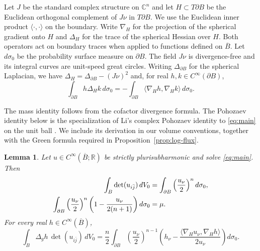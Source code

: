 \documentclass[11pt]{article}
\newtheorem{lemma}[theorem]{Lemma}
\newcommand{\C}{\mathbb C}
\newcommand{\R}{\mathbb R}
\begin{document}
Let $J$ be the standard complex structure on $\C^n$ and let
$H\subset T\partial B$ be the Euclidean orthogonal complement of
$J\nu$ in $T\partial B$. We use the Euclidean inner product
$\langle\cdot,\cdot\rangle$ on the boundary. Write $\nabla_H$ for the projection of the
spherical gradient onto $H$ and $\Delta_H$ for the trace of the
spherical Hessian over $H$. Both operators act on boundary traces
when applied to functions defined on $\overline B$. Let $d\sigma_0$
be the probability surface measure on $\partial B$. The field $J\nu$
is divergence-free and its integral curves are unit-speed great
circles. Writing $\Delta_{\partial B}$ for the spherical Laplacian,
we have $\Delta_H=\Delta_{\partial B}-(J\nu)^2$ and, for real
$h,k\in C^\infty(\partial B)$,
\begin{equation}\label{eq:horizontal-ibp}
 \int_{\partial B}h\Delta_Hk\,d\sigma_0
 =-\int_{\partial B}\langle\nabla_Hh,\nabla_Hk\rangle\,d\sigma_0.
\end{equation}

The mass identity follows from the cofactor divergence formula.
The Pohozaev identity below is the specialization of Li's complex
Pohozaev identity to \eqref{eq:main} on the unit ball \cite{Li2016}.
We include its derivation in our volume conventions, together with
the Green formula required in Proposition~\ref{prop:log-flux}.

\begin{lemma}\label{lem:boundary}
Let $u\in C^\infty(\overline B;\R)$ be strictly plurisubharmonic
and solve \eqref{eq:main}. Then
\begin{align}
 \int_B\det(u_{i\bar j})\,dV_0
 &=\int_{\partial B}\left(\frac{u_\nu}{2}\right)^n d\sigma_0,\notag\\
 \int_{\partial B}\left(\frac{u_\nu}{2}\right)^n
       \left(1-\frac{u_\nu}{2(n+1)}\right)d\sigma_0
 &=\mu.\label{eq:mass-pohozaev}
\end{align}
For every real $h\in C^\infty(\overline B)$,
\begin{equation}\label{eq:flux}
 \int_B\Delta_gh\,\det(u_{i\bar j})\,dV_0
 =\frac n2\int_{\partial B}\left(\frac{u_\nu}{2}\right)^{n-1}
 \left(h_\nu-
 \frac{\langle\nabla_Hu_\nu,\nabla_Hh\rangle}{2u_\nu}\right)d\sigma_0.
\end{equation}
\end{lemma}
\end{document}
